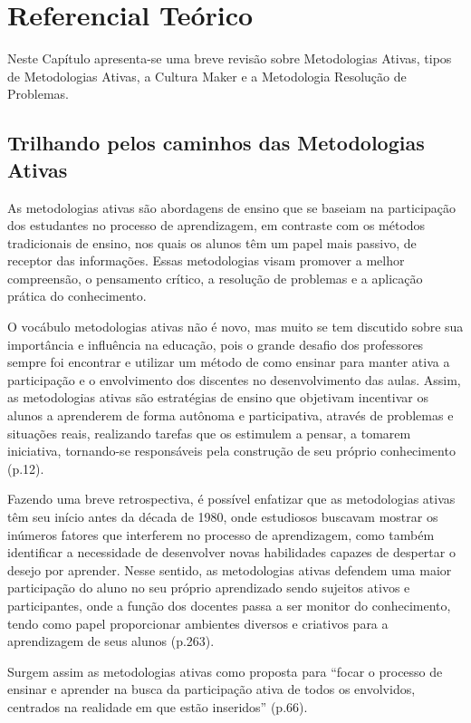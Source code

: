 \chapter{Referencial Teórico} \label{cap:2_referencial}

Neste Capítulo apresenta-se uma breve revisão sobre Metodologias Ativas, tipos de Metodologias Ativas, a Cultura Maker e a Metodologia Resolução de Problemas.

\section{Trilhando pelos caminhos das Metodologias Ativas}

As metodologias ativas são abordagens de ensino que se baseiam na participação dos estudantes no processo de aprendizagem, em contraste com os métodos tradicionais de ensino, nos quais os alunos têm um papel mais passivo, de receptor das informações. Essas metodologias visam promover a melhor compreensão, o pensamento crítico, a resolução de problemas e a aplicação prática do conhecimento.

O vocábulo metodologias ativas não é novo, mas muito se tem discutido sobre sua importância e influência na educação, pois o grande desafio dos professores sempre foi encontrar e utilizar um método de como ensinar para manter ativa a participação e o envolvimento dos discentes no desenvolvimento das aulas. Assim, as metodologias ativas são estratégias de ensino que objetivam incentivar os alunos a aprenderem de forma autônoma e participativa, através de problemas e situações reais, realizando tarefas que os estimulem a pensar, a tomarem iniciativa, tornando-se responsáveis pela construção de seu próprio conhecimento \cite{DIESEL2017} (p.12).

Fazendo uma breve retrospectiva, é possível enfatizar que as metodologias ativas têm seu início antes da década de 1980, onde estudiosos buscavam mostrar os inúmeros fatores que interferem no processo de aprendizagem, como também identificar a necessidade de desenvolver novas habilidades capazes de despertar o desejo por aprender. Nesse sentido, as metodologias ativas defendem uma maior participação do aluno no seu próprio aprendizado sendo sujeitos ativos e participantes, onde a função dos docentes passa a ser monitor do conhecimento, tendo como papel proporcionar ambientes diversos e criativos para a aprendizagem de seus alunos \cite{Mota2018} (p.263).

Surgem assim as metodologias ativas como proposta para ``focar o processo de ensinar e aprender na busca da participação ativa de todos os envolvidos, centrados na realidade em que estão inseridos'' \cite{FIALHO2017} (p.66).

